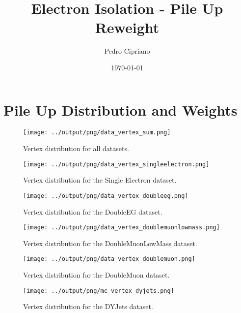 \documentclass[11pt]{book}
\begin{document}
         
 
 \author{Pedro Cipriano}
 \date{\today}
 \title{Electron Isolation - Pile Up Reweight}

\maketitle

\tableofcontents

\chapter{Pile Up Distribution and Weights}
\begin{figure}[htb]
\centering
\texttt{[image: ../output/png/data\_vertex\_sum.png]}
\caption{Vertex distribution for all datasets.}
\label{fig:data_vertex_sum}
\end{figure}


\begin{figure}[htb]
\centering
\texttt{[image: ../output/png/data\_vertex\_singleelectron.png]}
\caption{Vertex distribution for the Single Electron dataset.}
\label{fig:data_vertex_singleelectron}
\end{figure}

\begin{figure}[htb]
\centering
\texttt{[image: ../output/png/data\_vertex\_doubleeg.png]}
\caption{Vertex distribution for the DoubleEG dataset.}
\label{fig:data_vertex_doubleeg}
\end{figure}

\begin{figure}[htb]
\centering
\texttt{[image: ../output/png/data\_vertex\_doublemuonlowmass.png]}
\caption{Vertex distribution for the DoubleMuonLowMass dataset.}
\label{fig:data_vertex_doublemuonlowmass}
\end{figure}

\begin{figure}[htb]
\centering
\texttt{[image: ../output/png/data\_vertex\_doublemuon.png]}
\caption{Vertex distribution for the DoubleMuon dataset.}
\label{fig:data_vertex_doublemuon}
\end{figure}

\begin{figure}[htb]
\centering
\texttt{[image: ../output/png/mc\_vertex\_dyjets.png]}
\caption{Vertex distribution for the DYJets dataset.}
\label{fig:mc_vertex_dyjets}
\end{figure}
\end{document}
